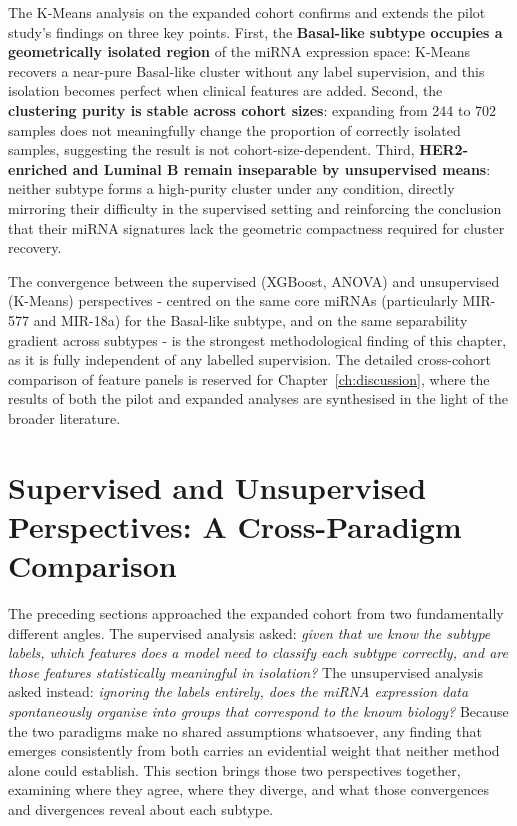 The K-Means analysis on the expanded cohort confirms and extends the pilot study's
findings on three key points. First, the \textbf{Basal-like subtype occupies a
geometrically isolated region} of the miRNA expression space: K-Means recovers a
near-pure Basal-like cluster without any label supervision, and this isolation becomes
perfect when clinical features are added. Second, the \textbf{clustering purity is
stable across cohort sizes}: expanding from 244 to 702 samples does not meaningfully
change the proportion of correctly isolated samples, suggesting the result is not
cohort-size-dependent. Third, \textbf{HER2-enriched and Luminal B remain inseparable
by unsupervised means}: neither subtype forms a high-purity cluster under any
condition, directly mirroring their difficulty in the supervised setting and
reinforcing the conclusion that their miRNA signatures lack the geometric compactness
required for cluster recovery.

The convergence between the supervised (XGBoost, ANOVA) and unsupervised (K-Means)
perspectives - centred on the same core miRNAs (particularly MIR-577 and MIR-18a)
for the Basal-like subtype, and on the same separability gradient across subtypes -
is the strongest methodological finding of this chapter, as it is fully independent
of any labelled supervision. The detailed cross-cohort comparison of feature panels
is reserved for Chapter~\ref{ch:discussion}, where the results of both the pilot and
expanded analyses are synthesised in the light of the broader literature.

\FloatBarrier
\section{Supervised and Unsupervised Perspectives: A Cross-Paradigm Comparison}
\label{sec:expanded_cross_paradigm}

The preceding sections approached the expanded cohort from two fundamentally different
angles. The supervised analysis asked: \textit{given that we know the subtype labels,
which features does a model need to classify each subtype correctly, and are those
features statistically meaningful in isolation?} The unsupervised analysis asked
instead: \textit{ignoring the labels entirely, does the miRNA expression data
spontaneously organise into groups that correspond to the known biology?} Because
the two paradigms make no shared assumptions whatsoever, any
finding that emerges consistently from both carries an evidential weight that neither
method alone could establish. This section brings those two perspectives together,
examining where they agree, where they diverge, and what those convergences and
divergences reveal about each subtype.

